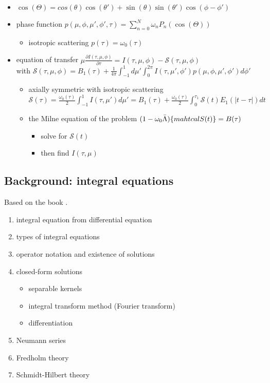 \documentclass[../main/main.tex]{subfiles}
\begin{document}
\begin{itemize}
\item $\cos(\Theta) = cos(\theta)\cos(\theta') + \sin(\theta)\sin(\theta') \cos(\phi-\phi')$

\item phase function $\boxed{p(\mu,\phi,\mu',\phi',\tau) = \sum_{n=0}^N \omega_n P_n(\cos(\Theta))}$
\begin{itemize}

\item isotropic scattering $p(\tau) = \omega_0(\tau)$
\end{itemize}

\item equation of transfer $\boxed{\mu \frac{\partial I(\tau,\mu,\phi)}{\partial \tau} = I(\tau,\mu,\phi) - \mathcal{S}(\tau,\mu,\phi)}$ 
\\ with $\mathcal{S}(\tau,\mu,\phi) = B_1(\tau) + \frac{1}{4 \pi} \int_{-1}^{1} d\mu' \int_0^{2\pi} I(\tau,\mu',\phi') p(\mu,\phi,\mu',\phi') d\phi'$
\begin{itemize}
\item axially symmetric with isotropic scattering \\
$\mathcal{S}(\tau) = \frac{\omega_0(\tau)}{2} \int_{-1}^{1} I(\tau,\mu') d\mu' = 
B_1(\tau) + \frac{\omega_0(\tau)}{2} \int_0^{\tau_1} \mathcal{S} (t) E_1(|t-\tau|)dt $
\item the Milne equation of the problem $(1-\omega_0 \bar{\Lambda})\{ \\mahtcal{S}(t)\} = B(\tau)$
\begin{itemize}
\item solve for $\mathcal{S}(t)$
\item then find $I(\tau,\mu)$
\end{itemize}
\end{itemize}
\end{itemize}


\subsection{Background: integral equations}
Based on the book \cite{Mmfp}.
\begin{enumerate}
\item integral equation from differential equation
\item types of integral equations
\item operator notation and existence of solutions
\item closed-form solutions
\begin{itemize}
\item separable kernels
\item integral transform method (Fourier transform)
\item differentiation
\end{itemize}

\item Neumann series
\item Fredholm theory
\item Schmidt-Hilbert theory
\end{enumerate}
\end{document}
